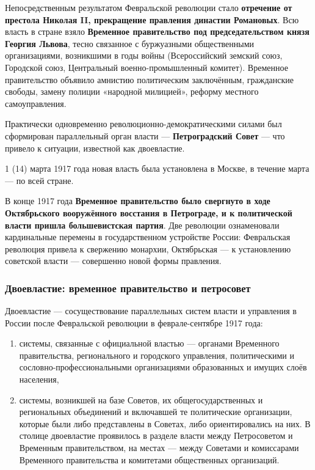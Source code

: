 \documentclass{article}
\begin{document}
\hfill

Непосредственным результатом Февральской революции стало \textbf{отречение от престола Николая II, прекращение правления династии Романовых}. Всю власть в стране взяло \textbf{Временное правительство под председательством князя Георгия Львова}, тесно связанное с буржуазными общественными организациями, возникшими в годы войны (Всероссийский земский союз, Городской союз, Центральный военно-промышленный комитет). Временное правительство объявило амнистию политическим заключённым, гражданские свободы, замену полиции «народной милицией», реформу местного самоуправления.

\hfill

Практически одновременно революционно-демократическими силами был сформирован параллельный орган власти — \textbf{Петроградский Совет} — что привело к ситуации, известной как двоевластие.

\hfill

1 (14) марта 1917 года новая власть была установлена в Москве, в течение марта — по всей стране.

\hfill

В конце 1917 года \textbf{Временное правительство было свергнуто в ходе Октябрьского вооружённого восстания в Петрограде, и к политической власти пришла большевистская партия}. Две революции ознаменовали кардинальные перемены в государственном устройстве России: Февральская революция привела к свержению монархии, Октябрьская — к установлению советской власти — совершенно новой формы правления.

\subsubsection{Двоевластие: временное правительство и петросовет}

Двоевластие — сосуществование параллельных систем власти и управления в России после Февральской революции в феврале-сентябре 1917 года:

\begin{enumerate}
    \item системы, связанные с официальной властью — органами Временного правительства, регионального и городского управления, политическими и сословно-профессиональными организациями образованных и имущих слоёв населения,
    \item системы, возникшей на базе Советов, их общегосударственных и региональных объединений и включавшей те политические организации, которые были либо представлены в Советах, либо ориентировались на них. В столице двоевластие проявилось в разделе власти между Петросоветом и Временным правительством, на местах — между Советами и комиссарами Временного правительства и комитетами общественных организаций.
\end{enumerate}
\end{document}
